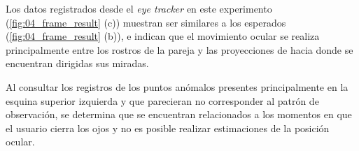 \documentclass[\main/main.tex]{subfiles}
\begin{document}
        Los datos registrados desde el \textit{eye tracker} en este experimento (\ref{fig:04_frame_result} (c)) muestran ser similares a los esperados (\ref{fig:04_frame_result} (b)), e indican que el movimiento ocular se realiza principalmente entre los rostros de la pareja y las proyecciones de hacia donde se encuentran dirigidas sus miradas. 

        Al consultar los registros de los puntos anómalos presentes principalmente en la esquina superior izquierda y que parecieran no corresponder al patrón de observación, se determina que se encuentran relacionados a los momentos en que el usuario cierra los ojos y no es posible realizar estimaciones de la posición ocular.    
\end{document}
